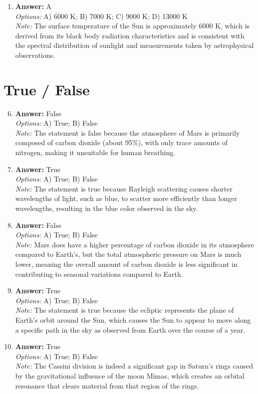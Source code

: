 \documentclass[12pt]{article}
\begin{document}
\begin{enumerate}[label=\arabic*.]
\item \textbf{Answer:} A
\\ \textit{Options:} A) 6000 K; B) 7000 K; C) 9000 K; D) 13000 K
\\ \textit{Note:} The surface temperature of the Sun is approximately 6000 K, which is derived from its black body radiation characteristics and is consistent with the spectral distribution of sunlight and measurements taken by astrophysical observations.
\end{enumerate}

\section*{True / False}
\begin{enumerate}[label=\arabic*.]
\setcounter{enumi}{5}
\item \textbf{Answer:} False
\\ \textit{Options:} A) True; B) False
\\ \textit{Note:} The statement is false because the atmosphere of Mars is primarily composed of carbon dioxide (about 95\%), with only trace amounts of nitrogen, making it unsuitable for human breathing.
\item \textbf{Answer:} True
\\ \textit{Options:} A) True; B) False
\\ \textit{Note:} The statement is true because Rayleigh scattering causes shorter wavelengths of light, such as blue, to scatter more efficiently than longer wavelengths, resulting in the blue color observed in the sky.
\item \textbf{Answer:} False
\\ \textit{Options:} A) True; B) False
\\ \textit{Note:} Mars does have a higher percentage of carbon dioxide in its atmosphere compared to Earth's, but the total atmospheric pressure on Mars is much lower, meaning the overall amount of carbon dioxide is less significant in contributing to seasonal variations compared to Earth.
\item \textbf{Answer:} True
\\ \textit{Options:} A) True; B) False
\\ \textit{Note:} The statement is true because the ecliptic represents the plane of Earth's orbit around the Sun, which causes the Sun to appear to move along a specific path in the sky as observed from Earth over the course of a year.
\item \textbf{Answer:} True
\\ \textit{Options:} A) True; B) False
\\ \textit{Note:} The Cassini division is indeed a significant gap in Saturn's rings caused by the gravitational influence of the moon Mimas, which creates an orbital resonance that clears material from that region of the rings.
\end{enumerate}
\end{document}
